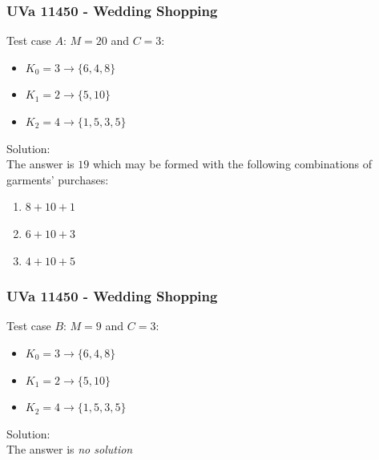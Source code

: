 \documentclass{beamer}
\begin{document}
\begin{frame}[fragile]
\frametitle{UVa 11450 - Wedding Shopping}

\color{red}Test case $A$: \color{black} $M=20$ and $C=3$:
\begin{itemize}
    \item $K_0=3 \rightarrow \{6,4,8\}$
    \item $K_1=2 \rightarrow \{5,10\}$
    \item $K_2=4 \rightarrow \{1,5,3,5\}$        
\end{itemize}

\pause

\vspace{0.3cm}

\color{red}Solution: \color{black} \\

The answer is $19$ which may be formed with the following combinations of garments' purchases:
\begin{enumerate}
    \item $8+10+1$
    \item $6+10+3$
    \item $4+10+5$
\end{enumerate}

\end{frame}

\begin{frame}[fragile]
\frametitle{UVa 11450 - Wedding Shopping}

\color{red}Test case $B$: \color{black} $M=9$ and $C=3$:
\begin{itemize}
    \item $K_0=3 \rightarrow \{6,4,8\}$
    \item $K_1=2 \rightarrow \{5,10\}$
    \item $K_2=4 \rightarrow \{1,5,3,5\}$        
\end{itemize}

\pause

\vspace{0.3cm}

\color{red}Solution: \color{black} \\

The answer is \textit{no solution}

\end{frame}
\end{document}
